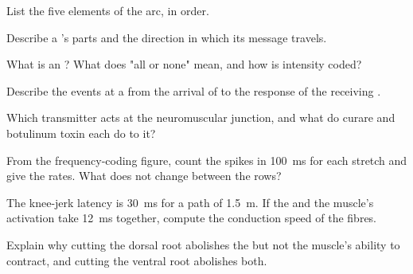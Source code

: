 \begin{exercise}[$\star$]\label{exo:g12:stretch-reflex:1}
List the five elements of the  arc, in order.
\end{exercise}

\begin{exercise}[$\star$]\label{exo:g12:stretch-reflex:2}
Describe a 's parts and the direction in which its message
travels.
\end{exercise}

\begin{exercise}[$\star$]\label{exo:g12:stretch-reflex:3}
What is an ? What does "all or none" mean, and how is
intensity coded?
\end{exercise}

\begin{exercise}[$\star$]\label{exo:g12:stretch-reflex:4}
Describe the events at a  from the arrival of  to the response of the receiving .
\end{exercise}

\begin{exercise}[$\star$]\label{exo:g12:stretch-reflex:5}
Which transmitter acts at the neuromuscular junction, and what do
curare and botulinum toxin each do to it?
\end{exercise}

\begin{exercise}[$\star\star$]\label{exo:g12:stretch-reflex:6}
From the frequency-coding figure, count the spikes in \qty{100}{ms} for
each stretch and give the rates. What does not change between the
rows?
\end{exercise}

\begin{exercise}[$\star\star$]\label{exo:g12:stretch-reflex:7}
The knee-jerk latency is \qty{30}{ms} for a path of \qty{1.5}{m}. If
the  and the muscle's activation take \qty{12}{ms} together,
compute the conduction speed of the fibres.
\end{exercise}

\begin{exercise}[$\star\star$]\label{exo:g12:stretch-reflex:8}
Explain why cutting the dorsal root abolishes the  but not the
muscle's ability to contract, and cutting the ventral root abolishes
both.
\end{exercise}

